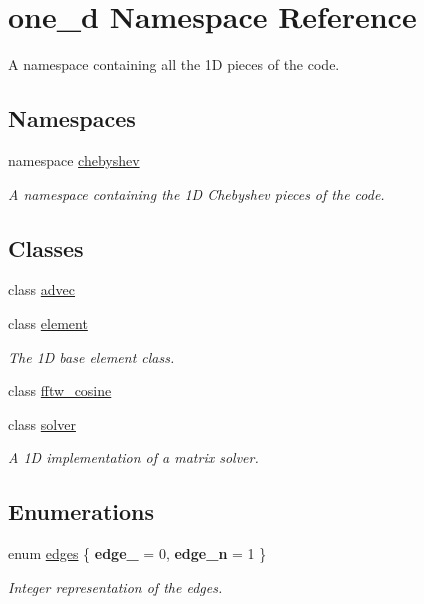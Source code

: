 \hypertarget{namespaceone__d}{\section{one\-\_\-d Namespace Reference}
\label{namespaceone__d}
}


A namespace containing all the 1\-D pieces of the code.  


\subsection*{Namespaces}
\begin{DoxyCompactItemize}
\item 
namespace \hyperlink{namespaceone__d_1_1chebyshev}{chebyshev}
\begin{DoxyCompactList}\small\item\em A namespace containing the 1\-D Chebyshev pieces of the code. \end{DoxyCompactList}\end{DoxyCompactItemize}
\subsection*{Classes}
\begin{DoxyCompactItemize}
\item 
class \hyperlink{classone__d_1_1advec}{advec}
\item 
class \hyperlink{classone__d_1_1element}{element}
\begin{DoxyCompactList}\small\item\em The 1\-D base element class. \end{DoxyCompactList}\item 
class \hyperlink{classone__d_1_1fftw__cosine}{fftw\-\_\-cosine}
\begin{DoxyCompactList}\small\item\em \end{DoxyCompactList}\item 
class \hyperlink{classone__d_1_1solver}{solver}
\begin{DoxyCompactList}\small\item\em A 1\-D implementation of a matrix solver. \end{DoxyCompactList}\end{DoxyCompactItemize}
\subsection*{Enumerations}
\begin{DoxyCompactItemize}
\item 
enum \hyperlink{namespaceone__d_a3eef7b83405976714f7a36833aaae26d}{edges} \{ {\bfseries edge\-\_} = 0, 
{\bfseries edge\-\_\-n} = 1
 \}
\begin{DoxyCompactList}\small\item\em Integer representation of the edges. \end{DoxyCompactList}\end{DoxyCompactItemize}



